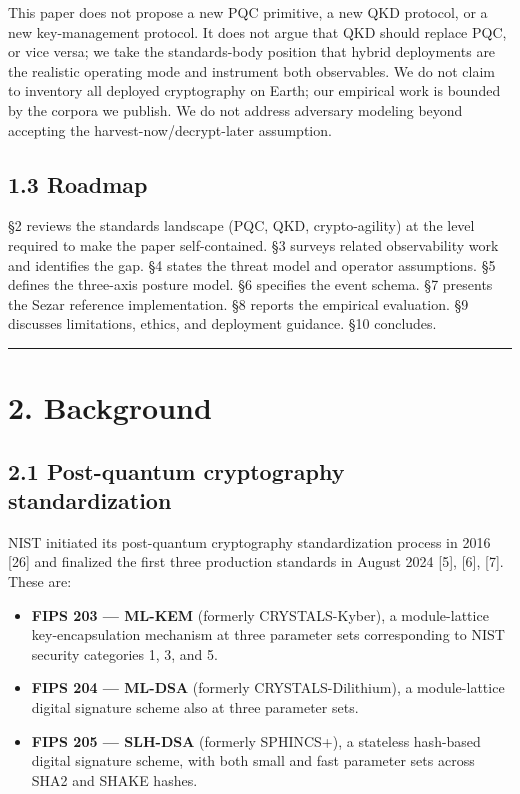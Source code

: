 This paper does not propose a new PQC primitive, a new QKD protocol, or
a new key-management protocol. It does not argue that QKD should replace
PQC, or vice versa; we take the standards-body position that hybrid
deployments are the realistic operating mode and instrument both
observables. We do not claim to inventory all deployed cryptography on
Earth; our empirical work is bounded by the corpora we publish. We do
not address adversary modeling beyond accepting the
harvest-now/decrypt-later assumption.

\subsection{1.3 Roadmap}\label{roadmap}

§2 reviews the standards landscape (PQC, QKD, crypto-agility) at the
level required to make the paper self-contained. §3 surveys related
observability work and identifies the gap. §4 states the threat model
and operator assumptions. §5 defines the three-axis posture model. §6
specifies the event schema. §7 presents the Sezar reference
implementation. §8 reports the empirical evaluation. §9 discusses
limitations, ethics, and deployment guidance. §10 concludes.

\begin{center}\rule{0.5\linewidth}{0.5pt}\end{center}

\section{2. Background}\label{background}

\subsection{2.1 Post-quantum cryptography
standardization}\label{post-quantum-cryptography-standardization}

NIST initiated its post-quantum cryptography standardization process in
2016 {[}26{]} and finalized the first three production standards in
August 2024 {[}5{]}, {[}6{]}, {[}7{]}. These are:

\begin{itemize}
\tightlist
\item
  \textbf{FIPS 203 --- ML-KEM} (formerly CRYSTALS-Kyber), a
  module-lattice key-encapsulation mechanism at three parameter sets
  corresponding to NIST security categories 1, 3, and 5.
\item
  \textbf{FIPS 204 --- ML-DSA} (formerly CRYSTALS-Dilithium), a
  module-lattice digital signature scheme also at three parameter sets.
\item
  \textbf{FIPS 205 --- SLH-DSA} (formerly SPHINCS+), a stateless
  hash-based digital signature scheme, with both small and fast
  parameter sets across SHA2 and SHAKE hashes.
\end{itemize}

